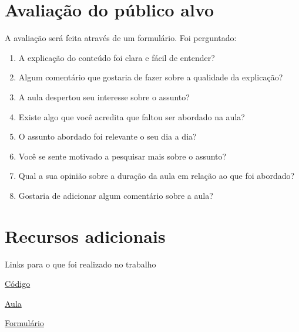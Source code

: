 \documentclass[sigconf]{acmart}
\begin{document}
\section{Avaliação do público alvo}

A avaliação será feita através de um formulário. Foi perguntado: 

\begin{enumerate}
    \item A explicação do conteúdo foi clara e fácil de entender?
    \item Algum comentário que gostaria de fazer sobre a qualidade da explicação?
    \item A aula despertou seu interesse sobre o assunto?
    \item Existe algo que você acredita que faltou ser abordado na aula?
    \item O assunto abordado foi relevante o seu dia a dia?
    \item Você se sente motivado a pesquisar mais sobre o assunto?
    \item Qual a sua opinião sobre a duração da aula em relação ao que foi abordado?
    \item Gostaria de adicionar algum comentário sobre a aula?
\end{enumerate}

\section{Recursos adicionais}

Links para o que foi realizado no trabalho

\href{https://github.com/Fernando-Goncalves-Campos/Two-Tower-Recommender-Systems}{Código}

\href{https://drive.google.com/file/d/1NcdgdX3pl0ckHoycoLXk8ErormbaWQan/view?usp=sharing}{Aula}

\href{https://docs.google.com/forms/d/e/1FAIpQLSfs23afuEESuf2PkeNfgvy1k7LwaSePt5ZhKzjw_IRcuJCAgA/viewform?usp=sharing}{Formulário}


\printbibliography[title={Referências}]
\end{document}
